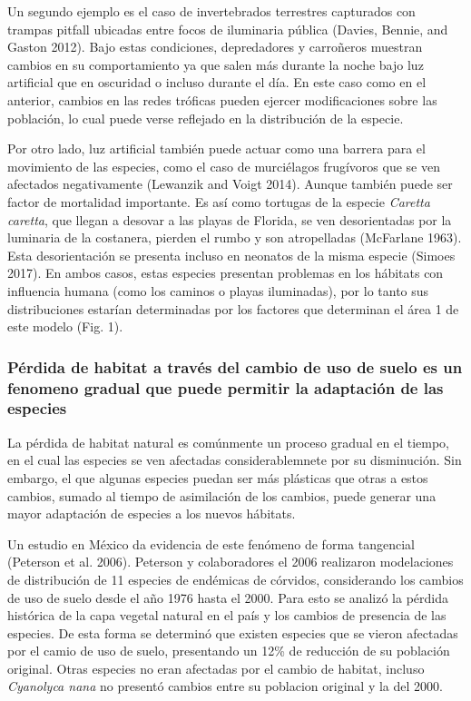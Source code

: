 \documentclass[]{article}
\begin{document}
Un segundo ejemplo es el caso de invertebrados terrestres capturados con
trampas pitfall ubicadas entre focos de iluminaria pública (Davies,
Bennie, and Gaston 2012). Bajo estas condiciones, depredadores y
carroñeros muestran cambios en su comportamiento ya que salen más
durante la noche bajo luz artificial que en oscuridad o incluso durante
el día. En este caso como en el anterior, cambios en las redes tróficas
pueden ejercer modificaciones sobre las población, lo cual puede verse
reflejado en la distribución de la especie.

Por otro lado, luz artificial también puede actuar como una barrera para
el movimiento de las especies, como el caso de murciélagos frugívoros
que se ven afectados negativamente (Lewanzik and Voigt 2014). Aunque
también puede ser factor de mortalidad importante. Es así como tortugas
de la especie \emph{Caretta caretta}, que llegan a desovar a las playas
de Florida, se ven desorientadas por la luminaria de la costanera,
pierden el rumbo y son atropelladas (McFarlane 1963). Esta
desorientación se presenta incluso en neonatos de la misma especie
(Simoes 2017). En ambos casos, estas especies presentan problemas en los
hábitats con influencia humana (como los caminos o playas iluminadas),
por lo tanto sus distribuciones estarían determinadas por los factores
que determinan el área 1 de este modelo (Fig. 1).

\subsubsection{Pérdida de habitat a través del cambio de uso de suelo es
un fenomeno gradual que puede permitir la adaptación de las
especies}\label{perdida-de-habitat-a-traves-del-cambio-de-uso-de-suelo-es-un-fenomeno-gradual-que-puede-permitir-la-adaptacion-de-las-especies}

La pérdida de habitat natural es comúnmente un proceso gradual en el
tiempo, en el cual las especies se ven afectadas considerablemnete por
su disminución. Sin embargo, el que algunas especies puedan ser más
plásticas que otras a estos cambios, sumado al tiempo de asimilación de
los cambios, puede generar una mayor adaptación de especies a los nuevos
hábitats.

Un estudio en México da evidencia de este fenómeno de forma tangencial
(Peterson et al. 2006). Peterson y colaboradores el 2006 realizaron
modelaciones de distribución de 11 especies de endémicas de córvidos,
considerando los cambios de uso de suelo desde el año 1976 hasta el
2000. Para esto se analizó la pérdida histórica de la capa vegetal
natural en el país y los cambios de presencia de las especies. De esta
forma se determinó que existen especies que se vieron afectadas por el
camio de uso de suelo, presentando un 12\% de reducción de su población
original. Otras especies no eran afectadas por el cambio de habitat,
incluso \emph{Cyanolyca nana} no presentó cambios entre su poblacion
original y la del 2000.
\end{document}
